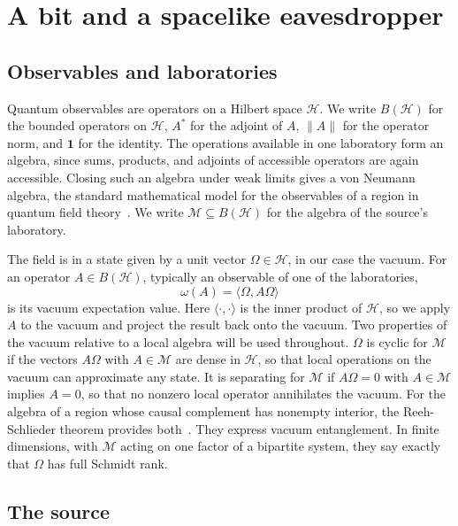 \documentclass[11pt,a4paper]{article}
\providecommand{\openone}{\mathbf{1}}
\newcommand{\M}{\mathcal M}
\newcommand{\id}{\openone}
\begin{document}
\section{A bit and a spacelike eavesdropper}
\label{sec:setup}

\subsection{Observables and laboratories}

Quantum observables are operators on a Hilbert space $\mathcal H$. We write $B(\mathcal H)$ for the bounded operators on $\mathcal H$, $A^*$ for the adjoint of $A$, $\|A\|$ for the operator norm, and $\id$ for the identity. The operations available in one laboratory form an algebra, since sums, products, and adjoints of accessible operators are again accessible. Closing such an algebra under weak limits gives a von Neumann algebra, the standard mathematical model for the observables of a region in quantum field theory~\cite{haag1996local}. We write $\M\subseteq B(\mathcal H)$ for the algebra of the source's laboratory.

The field is in a state given by a unit vector $\Omega\in\mathcal H$, in our case the vacuum. For an operator $A\in B(\mathcal H)$, typically an observable of one of the laboratories,
\begin{equation*}
 \omega(A)=\langle\Omega,A\Omega\rangle
\end{equation*}
is its vacuum expectation value. Here $\langle\cdot,\cdot\rangle$ is the inner product of $\mathcal H$, so we apply $A$ to the vacuum and project the result back onto the vacuum. Two properties of the vacuum relative to a local algebra will be used throughout. $\Omega$ is cyclic for $\M$ if the vectors $A\Omega$ with $A\in\M$ are dense in $\mathcal H$, so that local operations on the vacuum can approximate any state. It is separating for $\M$ if $A\Omega=0$ with $A\in\M$ implies $A=0$, so that no nonzero local operator annihilates the vacuum. For the algebra of a region whose causal complement has nonempty interior, the Reeh-Schlieder theorem provides both~\cite{haag1996local}. They express vacuum entanglement. In finite dimensions, with $\M$ acting on one factor of a bipartite system, they say exactly that $\Omega$ has full Schmidt rank.

\subsection{The source}
\end{document}

